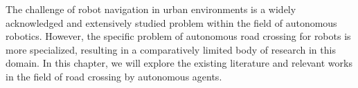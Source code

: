 The challenge of robot navigation in urban environments is a widely acknowledged and extensively studied problem within the field of autonomous robotics. However, the specific problem of autonomous road crossing for robots is more specialized, resulting in a comparatively limited body of research in this domain. In this chapter, we will explore the existing literature and relevant works in the field of road crossing by autonomous agents.\\

